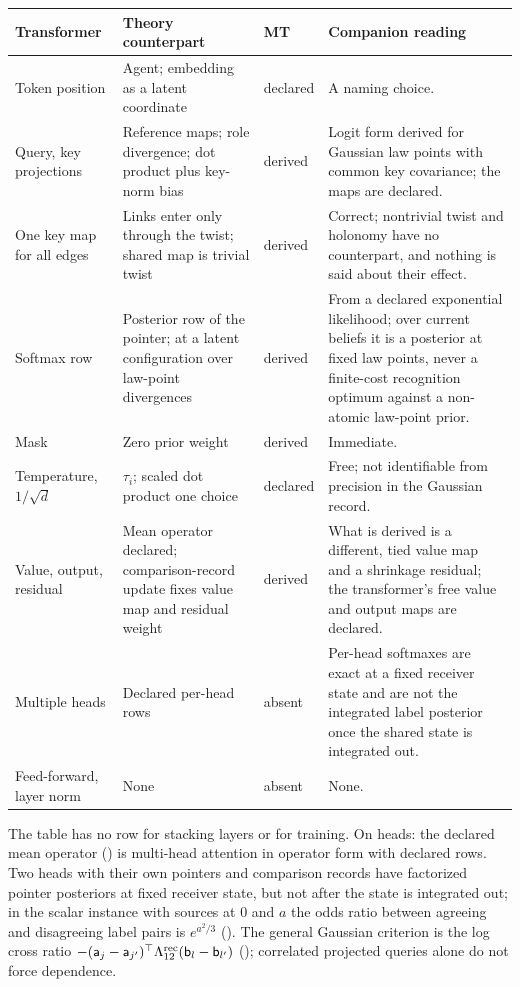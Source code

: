 \begingroup\small
\begin{longtable}{@{}>{\raggedright\arraybackslash}p{}>{\raggedright\arraybackslash}p{}>{\raggedright\arraybackslash}p{}>{\raggedright\arraybackslash}p{}@{}}
\toprule
\textbf{Transformer} & \textbf{Theory counterpart} & \textbf{MT} & \textbf{Companion reading}\\
\midrule\endhead
\bottomrule\endfoot
Token position & Agent; embedding as a latent coordinate & declared & A naming choice.\\
Query, key projections & Reference maps; role divergence; dot product plus key-norm bias & derived & Logit form derived for Gaussian law points with common key covariance; the maps are declared.\\
One key map for all edges & Links enter only through the twist; shared map is trivial twist & derived & Correct; nontrivial twist and holonomy have no counterpart, and nothing is said about their effect.\\
Softmax row & Posterior row of the pointer; at a latent configuration over law-point divergences & derived & From a declared exponential likelihood; over current beliefs it is a posterior at fixed law points, never a finite-cost recognition optimum against a non-atomic law-point prior.\\
Mask & Zero prior weight & derived & Immediate.\\
Temperature, $1/\sqrt d$ & $\tau_i$; scaled dot product one choice & declared & Free; not identifiable from precision in the Gaussian record.\\
Value, output, residual & Mean operator declared; comparison-record update fixes value map and residual weight & derived & What is derived is a different, tied value map and a shrinkage residual; the transformer's free value and output maps are declared.\\
Multiple heads & Declared per-head rows & absent & Per-head softmaxes are exact at a fixed receiver state and are not the integrated label posterior once the shared state is integrated out.\\
Feed-forward, layer norm & None & absent & None.\\
\end{longtable}
\endgroup

The table has no row for stacking layers or for training. On heads: the declared mean operator
() is multi-head attention in operator form with declared rows. Two heads with
their own pointers and comparison records have factorized pointer posteriors at fixed receiver state, but not after the
state is integrated out; in the scalar instance with sources at $0$ and $a$ the odds ratio between agreeing and
disagreeing label pairs is $e^{a^2/3}$ (). The general Gaussian criterion is the log
cross ratio $-(\mathsf a_j-\mathsf a_{j'})^\top\Lambda^{\rm rec}_{12}(\mathsf b_l-\mathsf b_{l'})$
(); correlated projected queries alone do not force dependence.

